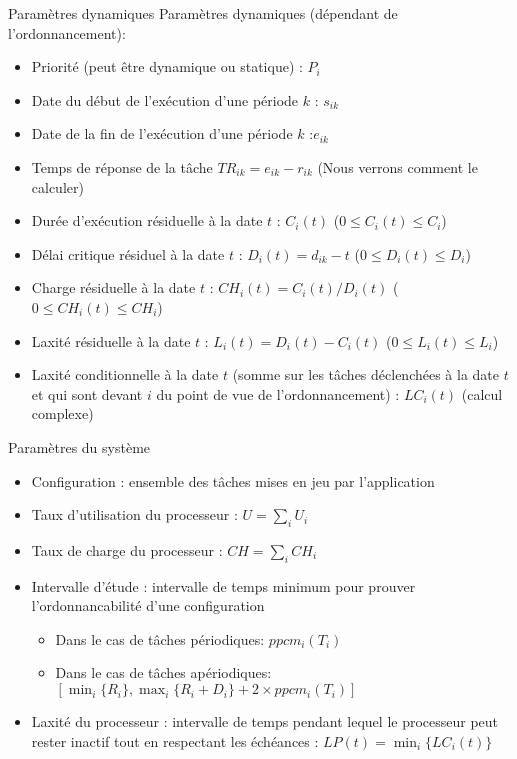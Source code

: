 \begin{frame}{Paramètres dynamiques}
  Paramètres dynamiques (dépendant de l'ordonnancement):
  \begin{itemize}
  \item Priorité (peut être dynamique ou statique) : $P_i$
  \item Date du début de l'exécution d'une période $k$ : $s_{ik}$
  \item Date de la fin de l'exécution d'une période $k$ :$e_{ik}$
  \item Temps de réponse de la tâche $TR_{ik} = e_{ik} - r_{ik}$ (Nous
    verrons comment le calculer)
  \item Durée d'exécution résiduelle à la date $t$ : $C_i(t)$ ($0 ≤
    C_i(t) ≤ C_i$)
  \item Délai  critique résiduel à la  date $t$ :  $D_i(t) = d_{ik}-t$
    ($0 ≤ D_i(t) ≤ D_i$)
  \item Charge résiduelle à la date $t$ :
    $CH_i(t) = C_i(t) / D_i(t)$  ($0 ≤ CH_i(t) ≤ CH_i$)
  \item Laxité  résiduelle à la  date $t$ :
    $L_i(t) = D_i(t) - C_i(t)$  ($0  ≤ L_i(t) ≤  L_i$)
  \item  Laxité conditionnelle  à la  date $t$  (somme sur  les tâches
    déclenchées à la  date $t$ et qui sont devant $i$  du point de vue
    de  l'ordonnancement)  :  $LC_i(t)$ (calcul complexe)
  \end{itemize}
\end{frame}


\begin{frame}{Paramètres du système}
  \begin{itemize}
  \item  Configuration  :  ensemble   des  tâches  mises  en  jeu  par
    l'application
  \item Taux d'utilisation du processeur : $U = \sum_i U_i$
  \item Taux de charge du processeur : $CH = \sum_i CH_i$
  \item Intervalle d'étude :  intervalle de temps minimum pour prouver
    l'ordonnancabilité  d'une  configuration
    \begin{itemize}
    \item  Dans  le  cas de  tâches périodiques: $ppcm_i(T_i)$
    \item  Dans le cas  de tâches  apériodiques: $\left[\min_i\{R_i\},
        \max_i\{R_i + D_i\} + 2 \times ppcm_i(T_i)\right]$
    \end{itemize}
  \item Laxité du  processeur : intervalle de temps  pendant lequel le
    processeur peut rester inactif  tout en respectant les échéances :
    $ LP(t) = \min_i\{LC_i(t)\}$
  \end{itemize}
\end{frame}

